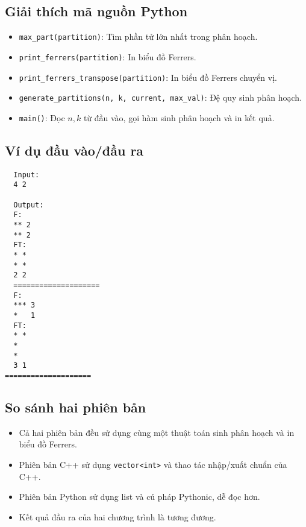 \documentclass[12pt]{article}
\begin{document}
\subsection*{Giải thích mã nguồn Python}
\begin{itemize}
  \item \texttt{max\_part(partition)}: Tìm phần tử lớn nhất trong phân hoạch.
  \item \texttt{print\_ferrers(partition)}: In biểu đồ Ferrers.
  \item \texttt{print\_ferrers\_transpose(partition)}: In biểu đồ Ferrers chuyển vị.
  \item \texttt{generate\_partitions(n, k, current, max\_val)}: Đệ quy sinh phân hoạch.
  \item \texttt{main()}: Đọc $n, k$ từ đầu vào, gọi hàm sinh phân hoạch và in kết quả.
\end{itemize}

\subsection*{Ví dụ đầu vào/đầu ra}
\begin{verbatim}
  Input:
  4 2

  Output:
  F:
  ** 2
  ** 2
  FT:
  * *
  * *
  2 2
  ====================
  F:
  *** 3
  *   1
  FT:
  * *
  *  
  *  
  3 1
====================
\end{verbatim}

\subsection*{So sánh hai phiên bản}
\begin{itemize}
  \item Cả hai phiên bản đều sử dụng cùng một thuật toán sinh phân hoạch và in biểu đồ Ferrers.
  \item Phiên bản C++ sử dụng \texttt{vector<int>} và thao tác nhập/xuất chuẩn của C++.
  \item Phiên bản Python sử dụng list và cú pháp Pythonic, dễ đọc hơn.
  \item Kết quả đầu ra của hai chương trình là tương đương.
\end{itemize}

\end{document}
